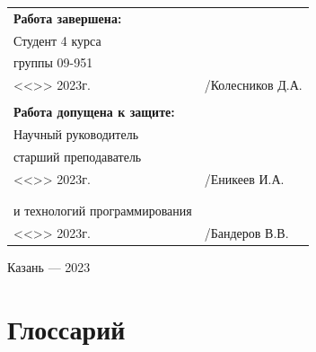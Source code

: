 \documentclass[a4paper,article]{article}
\begin{document}
\begin{titlepage}
        \begin{xltabular}{\textwidth} {
                >{\hsize} X
                >{\hsize} X }
            \bfseries{Работа завершена:} & \\
            Студент 4 курса & \\
            группы 09-951 & \\
            <<\underline{\hspace{1cm}}>>\underline{\hspace{3cm}} 2023г. & \underline{\hspace{3cm}}/Колесников Д.А. \\
            & \\
            \bfseries{Работа допущена к защите:} & \\
            Научный руководитель & \\
            старший преподаватель & \\
            <<\underline{\hspace{1cm}}>>\underline{\hspace{3cm}} 2023г. & \underline{\hspace{3cm}}/Еникеев И.А. \\
            & \\
             \\
            и технологий программирования & \\
            <<\underline{\hspace{1cm}}>>\underline{\hspace{3cm}} 2023г. & \underline{\hspace{3cm}}/Бандеров В.В. \\
        \end{xltabular}

        \vspace{0mm}

        \begin{center}
            Казань — 2023
        \end{center}
    \end{titlepage}

    \newpage

    \setcounter{page}{2}

    \tableofcontents

    \newpage

    \section*{Глоссарий}
\end{document}
